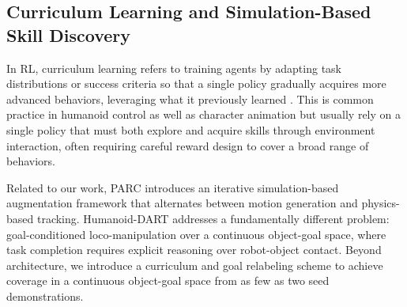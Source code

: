 \documentclass{article}
\begin{document}
\subsection{Curriculum Learning and Simulation-Based Skill Discovery}

In RL, curriculum learning refers to training agents by adapting task distributions or success criteria so that a single policy gradually acquires more advanced behaviors, leveraging what it previously learned \cite{JMLR:v21:20-212}. This is common practice in humanoid control as well as character animation \cite{huang2025learninghumanoidstandingupcontrol, zhang2024wococo, liu2026humanoidwholebodybadmintonmultistage, LeeLearning2021} but usually rely on a single policy that must both explore and acquire skills through environment interaction, often requiring careful reward design to cover a broad range of behaviors.

Related to our work, PARC \cite{xu2025parc} introduces an iterative simulation-based augmentation framework that alternates between motion generation and physics-based tracking. Humanoid-DART addresses a fundamentally different problem: goal-conditioned loco-manipulation over a continuous object-goal space, where task completion requires explicit reasoning over robot-object contact. Beyond architecture, we introduce a curriculum and goal relabeling scheme to achieve coverage in a continuous object-goal space from as few as two seed demonstrations.





\end{document}

